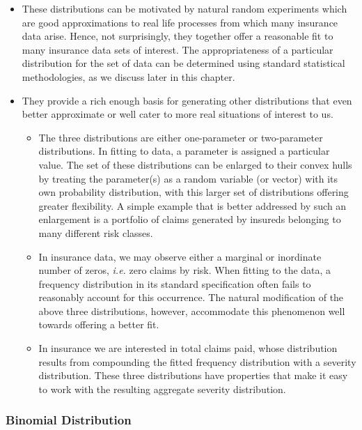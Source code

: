 \documentclass[]{book}
\providecommand{\tightlist}{%
  \setlength{\itemsep}{0pt}\setlength{\parskip}{0pt}}
\theoremstyle{definition}
\theoremstyle{definition}
\theoremstyle{definition}
\theoremstyle{remark}
\begin{document}
\begin{itemize}
\tightlist
\item
  These distributions can be motivated by natural random experiments
  which are good approximations to real life processes from which many
  insurance data arise. Hence, not surprisingly, they together offer a
  reasonable fit to many insurance data sets of interest. The
  appropriateness of a particular distribution for the set of data can
  be determined using standard statistical methodologies, as we discuss
  later in this chapter.
\item
  They provide a rich enough basis for generating other distributions
  that even better approximate or well cater to more real situations of
  interest to us.

  \begin{itemize}
  \tightlist
  \item
    The three distributions are either one-parameter or two-parameter
    distributions. In fitting to data, a parameter is assigned a
    particular value. The set of these distributions can be enlarged to
    their convex hulls by treating the parameter(s) as a random variable
    (or vector) with its own probability distribution, with this larger
    set of distributions offering greater flexibility. A simple example
    that is better addressed by such an enlargement is a portfolio of
    claims generated by insureds belonging to many different risk
    classes.
  \item
    In insurance data, we may observe either a marginal or inordinate
    number of zeros, \emph{i.e.} zero claims by risk. When fitting to
    the data, a frequency distribution in its standard specification
    often fails to reasonably account for this occurrence. The natural
    modification of the above three distributions, however, accommodate
    this phenomenon well towards offering a better fit.
  \item
    In insurance we are interested in total claims paid, whose
    distribution results from compounding the fitted frequency
    distribution with a severity distribution. These three distributions
    have properties that make it easy to work with the resulting
    aggregate severity distribution.
  \end{itemize}
\end{itemize}

\subsubsection{Binomial Distribution}\label{S:binomial-distribution}
\end{document}
